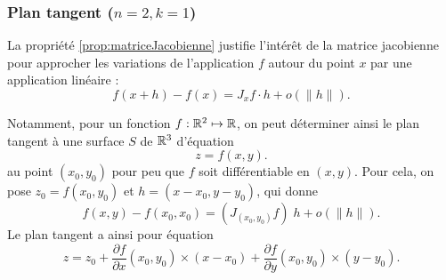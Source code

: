 
\subsubsection*{Plan tangent ($n = 2, k = 1$)}

La propriété \ref{prop:matriceJacobienne} justifie l'intérêt de la matrice jacobienne pour approcher les variations de l'application $f$ autour du point $x$ par une application linéaire : 
$$
f(x+h) - f(x) = J_xf \cdot h + o(\|h\|).
$$

Notamment, pour un fonction $f : \mathbb{R}^2 \mapsto \mathbb{R}$, on peut déterminer ainsi le plan tangent à une surface $S$ de $\mathbb{R}^3$ d'équation
$$
z = f(x, y).
$$
au point $(x_0, y_0)$ pour peu que $f$ soit différentiable en $(x, y)$. Pour cela, on pose $z_0 = f(x_0, y_0)$ et $h = (x-x_0, y-y_0)$, qui donne
$$
f(x, y) - f(x_0, x_0) = \left(J_{(x_0, y_0)} f\right) \; h + o(\|h\|).
$$
Le plan tangent a ainsi pour équation
$$
z = z_0 + \frac{\partial f}{\partial x}(x_0, y_0) \times (x-x_0) + \frac{\partial f}{\partial y}(x_0, y_0) \times (y-y_0).
$$

